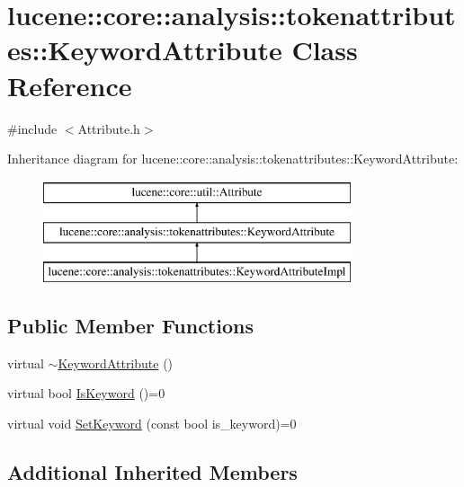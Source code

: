 \hypertarget{classlucene_1_1core_1_1analysis_1_1tokenattributes_1_1KeywordAttribute}{}\section{lucene\+:\+:core\+:\+:analysis\+:\+:tokenattributes\+:\+:Keyword\+Attribute Class Reference}
\label{classlucene_1_1core_1_1analysis_1_1tokenattributes_1_1KeywordAttribute}


{\ttfamily \#include $<$Attribute.\+h$>$}

Inheritance diagram for lucene\+:\+:core\+:\+:analysis\+:\+:tokenattributes\+:\+:Keyword\+Attribute\+:\begin{figure}[H]
\begin{center}
\leavevmode
\includegraphics[height=3.000000cm]{classlucene_1_1core_1_1analysis_1_1tokenattributes_1_1KeywordAttribute}
\end{center}
\end{figure}
\subsection*{Public Member Functions}
\begin{DoxyCompactItemize}
\item 
virtual \mbox{\hyperlink{classlucene_1_1core_1_1analysis_1_1tokenattributes_1_1KeywordAttribute_ad4ee53eaa0a2bd3b32e3f94c7be179e7}{$\sim$\+Keyword\+Attribute}} ()
\item 
virtual bool \mbox{\hyperlink{classlucene_1_1core_1_1analysis_1_1tokenattributes_1_1KeywordAttribute_af6270bf727324f1809a18a1fc9b1a27c}{Is\+Keyword}} ()=0
\item 
virtual void \mbox{\hyperlink{classlucene_1_1core_1_1analysis_1_1tokenattributes_1_1KeywordAttribute_aee23c674ba6af03521985734f739c9d5}{Set\+Keyword}} (const bool is\+\_\+keyword)=0
\end{DoxyCompactItemize}
\subsection*{Additional Inherited Members}


